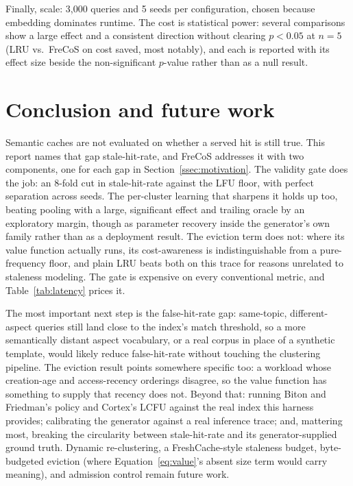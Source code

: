 \documentclass[10pt]{article}
\begin{document}
Finally, scale: 3{,}000 queries and 5 seeds per configuration, chosen because embedding
dominates runtime. The cost is statistical power: several comparisons show a large effect and
a consistent direction without clearing $p<0.05$ at $n=5$ (LRU vs.\ FreCoS on cost saved, most
notably), and each is reported with its effect size beside the non-significant $p$-value
rather than as a null result.

\section{Conclusion and future work}

Semantic caches are not evaluated on whether a served hit is still true. This report names
that gap stale-hit-rate, and FreCoS addresses it with two components, one for each gap in Section~\ref{ssec:motivation}. The
validity gate does the job: an 8-fold cut in stale-hit-rate against the LFU floor, with
perfect separation across seeds. The per-cluster learning that sharpens it holds up too, beating pooling
with a large, significant effect and trailing oracle by an exploratory margin, though as
parameter recovery inside the generator's own family rather than as a deployment result. The
eviction term does not: where its value function actually runs, its cost-awareness is
indistinguishable from a pure-frequency floor, and plain LRU beats both on this trace for
reasons unrelated to staleness modeling. The gate is expensive on every conventional metric,
and Table~\ref{tab:latency} prices it.

The most important next step is the false-hit-rate gap: same-topic, different-aspect
queries still land close to the index's match threshold, so a more semantically distant aspect
vocabulary, or a real corpus in place of a synthetic template, would likely reduce
false-hit-rate without touching the clustering pipeline. The eviction result points somewhere
specific too: a workload whose creation-age and access-recency orderings disagree, so the
value function has something to supply that recency does not. Beyond that: running Biton and Friedman's
policy and Cortex's LCFU against the real index this harness provides; calibrating the
generator against a real inference trace; and, mattering most, breaking the circularity
between stale-hit-rate and its generator-supplied ground truth. Dynamic re-clustering, a
FreshCache-style staleness budget, byte-budgeted eviction (where Equation~\ref{eq:value}'s
absent size term would carry meaning), and admission control remain future work.
\end{document}
